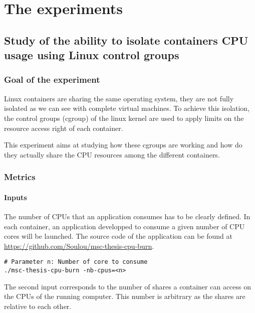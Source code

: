 \chapter{The experiments}
\label{experiments}

\section{Study of the ability to isolate containers CPU usage using Linux control groups}
\subsection{Goal of the experiment}

Linux containers are sharing the same operating system, they are not fully
isolated as we can see with complete virtual machines. To achieve this
isolation, the control groups (cgroup) of the linux kernel are used to
apply limits on the resource access right of each container.

This experiment aims at studying how these cgroups are working and how
do they actually share the CPU resources among the different containers.

\subsection{Metrics}

\subsubsection{Inputs}

The number of CPUs that an application consumes has to be clearly defined. In
each container, an application developped to consume a given number of CPU
cores will be launched. The source code of the application can be found at
\url{https://github.com/Soulou/msc-thesis-cpu-burn}.

\vspace{1em}

\lstset{language=bash}
\begin{lstlisting}
# Parameter n: Number of core to consume
./msc-thesis-cpu-burn -nb-cpus=<n>
\end{lstlisting}

The second input corresponds to the number of shares a container can access
on the CPUs of the running computer. This number is arbitrary as the shares
are relative to each other. 

